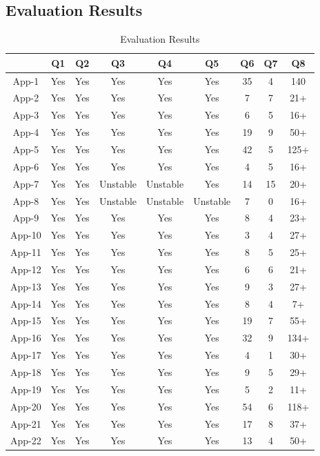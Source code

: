 \subsection{Evaluation Results}

\begin{table}[h!]
	\begin{center}
		\begin{tabular}{  |c|c|c|c|c|c|c|c|c|}
			\hline
			& Q1 & Q2 & Q3 & Q4 & Q5 & Q6 & Q7 & Q8 \\ \hline
			App-1 & Yes & Yes & Yes & Yes & Yes & 35 & 4 & 140 \\ \hline
			App-2 & Yes & Yes & Yes & Yes & Yes & 7 & 7 & 21+ \\ \hline
			App-3 & Yes & Yes & Yes & Yes & Yes & 6 & 5 & 16+ \\ \hline
			App-4 & Yes & Yes & Yes & Yes & Yes & 19 & 9 & 50+ \\ \hline
			App-5 & Yes & Yes & Yes & Yes & Yes & 42 & 5 & 125+ \\ \hline
			App-6 & Yes & Yes & Yes & Yes & Yes & 4 & 5 & 16+ \\ \hline
			App-7 & Yes & Yes & Unstable & Unstable & Yes & 14 & 15 & 20+ \\ \hline
			App-8 & Yes & Yes & Unstable & Unstable & Unstable & 7 & 0 & 16+ \\ \hline
			App-9 & Yes & Yes & Yes & Yes & Yes & 8 & 4 & 23+ \\ \hline
			App-10 & Yes & Yes & Yes & Yes & Yes & 3 & 4 & 27+ \\ \hline
			App-11 & Yes & Yes & Yes & Yes & Yes & 8 & 5 & 25+ \\ \hline
			App-12 & Yes & Yes & Yes & Yes & Yes & 6 & 6 & 21+ \\ \hline
			App-13 & Yes & Yes & Yes & Yes & Yes & 9 & 3 & 27+ \\ \hline
			App-14 & Yes & Yes & Yes & Yes & Yes & 8 & 4 & 7+ \\ \hline
			App-15 & Yes & Yes & Yes & Yes & Yes & 19 & 7 & 55+ \\ \hline
			App-16 & Yes & Yes & Yes & Yes & Yes & 32 & 9 & 134+ \\ \hline
			App-17 & Yes & Yes & Yes & Yes & Yes & 4 & 1 & 30+ \\ \hline
			App-18 & Yes & Yes & Yes & Yes & Yes & 9 & 5 & 29+ \\ \hline
			App-19 & Yes & Yes & Yes & Yes & Yes & 5 & 2 & 11+ \\ \hline
			App-20 & Yes & Yes & Yes & Yes & Yes & 54 & 6 & 118+ \\ \hline
			App-21 & Yes & Yes & Yes & Yes & Yes & 17 & 8 & 37+ \\ \hline
			App-22 & Yes & Yes & Yes & Yes & Yes & 13 & 4 & 50+ \\ \hline
			
			
	\end{tabular}
\end{center}
\caption{Evaluation Results}
\label{table:eval_results}
\end{table}


